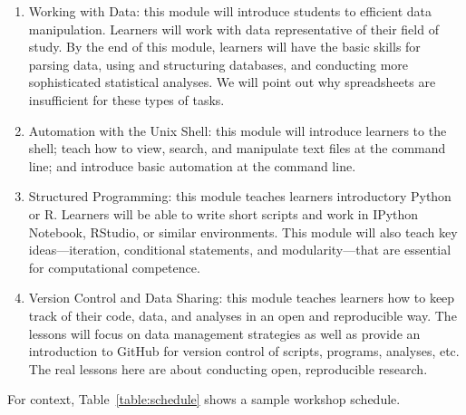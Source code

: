\documentclass{proposalnsf}
\begin{document}
\begin{enumerate}

\item Working with Data: this module will introduce students to
  efficient data manipulation. Learners will work with data
  representative of their field of study. By the end of this module,
  learners will have the basic skills for parsing data, using and
  structuring databases, and conducting more sophisticated statistical
  analyses. We will point out why spreadsheets are insufficient for
  these types of tasks.

\item Automation with the Unix Shell: this module will introduce
  learners to the shell; teach how to view, search, and manipulate
  text files at the command line; and introduce basic automation at
  the command line.

\item Structured Programming: this module teaches learners
  introductory Python or R.  Learners will be able to write short
  scripts and work in IPython Notebook, RStudio, or similar
  environments.  This module will also teach key ideas---iteration,
  conditional statements, and modularity---that are essential for
  computational competence.

\item Version Control and Data Sharing: this module teaches learners
  how to keep track of their code, data, and analyses in an open and
  reproducible way.  The lessons will focus on data management
  strategies as well as provide an introduction to GitHub for version
  control of scripts, programs, analyses, etc. The real lessons here
  are about conducting open, reproducible research.

\end{enumerate}

For context, Table~\ref{table:schedule} shows a sample workshop schedule.
\end{document}
